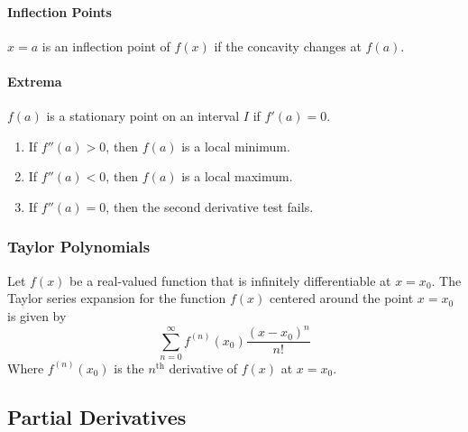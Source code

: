 \paragraph{Inflection Points}
$x = a$ is an inflection point of $f(x)$ if the concavity changes at $f(a)$.
\paragraph{Extrema}
$f(a)$ is a stationary point on an interval $I$ if $f'(a) = 0$.
\begin{enumerate}
	\item If $f''(a) > 0$, then $f(a)$ is a local minimum.
	\item If $f''(a)< 0$, then $f(a)$ is a local maximum.
	\item If $f''(a)= 0$, then the second derivative test fails.
\end{enumerate}

\subsubsection{Taylor Polynomials}
\begin{defn}
\label{taylorpoly}
Let $f(x)$ be a real-valued function that is infinitely differentiable at $x = x_0$. The Taylor series expansion for the function $f(x)$ centered around the point $x = x_0$ is given by
$$\sum_{n=0}^{\infty}f^{(n)}(x_0)\frac{(x - x_0)^{n}}{n!}$$
Where $f^{(n)}(x_0)$ is the $n^\text{th}$ derivative of $f(x)$ at $x = x_0$.
\end{defn}
\subsection{Partial Derivatives}